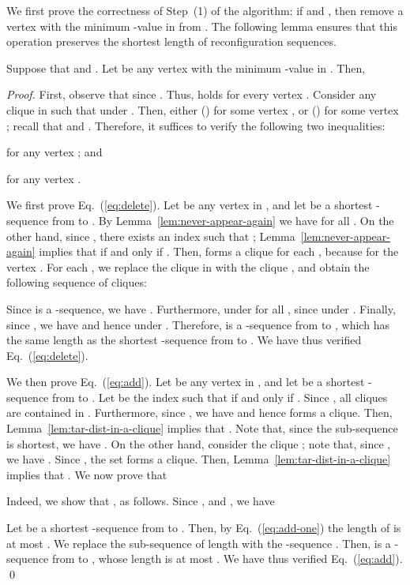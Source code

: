 \documentclass{llncs}
\newcounter{one}
\newcommand{\one}{{\rm \roman{one}}}
\newcounter{two}
\newcommand{\two}{{\rm \roman{two}}}
\begin{document}
	We first prove the correctness of Step~(1) of the algorithm:
if  and , then remove a vertex  with the minimum -value in  from .
The following lemma ensures that this operation preserves the shortest length of reconfiguration sequences.
	\begin{lemma} \label{lem:greedily-removing-a-shortest-interval}
	Suppose that  and .
	Let  be any vertex with the minimum -value in .
	Then, 
	
	\end{lemma}
	\begin{proof}
	First, observe that  since .
	Thus,  holds for every vertex .
	Consider any clique  in  such that  under .
	Then, either (\one)  for some vertex , or (\two)  for some vertex ;
recall that  and . 
	Therefore, it suffices to verify the following two inequalities:
	
for any vertex ; and 
	
for any vertex .
\medskip

	We first prove Eq.~(\ref{eq:delete}). 
	Let  be any vertex in , and let  be a shortest -sequence from  to  .
	By Lemma~\ref{lem:never-appear-again} we have  for all .
	On the other hand, since , there exists an index  such that ;
Lemma~\ref{lem:never-appear-again} implies that  if and only if .
	Then,  forms a clique for each , because  for the vertex .
	For each , we replace the clique  in  with the clique , and obtain the following sequence  of cliques:
	
	Since  is a -sequence, we have .
	Furthermore,  under  for all , since  under .
	Finally, since , we have  and hence  under .
	Therefore,  is a -sequence from  to  , which has the same length  as the shortest -sequence  from  to  .
	We have thus verified Eq.~(\ref{eq:delete}). 
\medskip  

 	We then prove Eq.~(\ref{eq:add}). 
	Let  be any vertex in , and let  be a shortest -sequence from  to  .
	Let  be the index such that  if and only if .
	Since , all cliques  are contained in . 
	Furthermore, since , we have  and hence   forms a clique.
	Then, Lemma~\ref{lem:tar-dist-in-a-clique} implies that .
	Note that, since the sub-sequence  is shortest, we have .
	On the other hand, consider the clique ;
note that, since , we have . 
	Since , the set  forms a clique.
	Then, Lemma~\ref{lem:tar-dist-in-a-clique} implies that .
	We now prove that 
	
	Indeed, we show that , as follows.
	Since ,  and , we have 
	
	Let  be a shortest -sequence from  to .
	Then, by Eq.~(\ref{eq:add-one}) the length of  is at most .
	We replace the sub-sequence  of length  with the -sequence .
	Then,  is a -sequence from  to , whose length is at most .
	We have thus verified Eq.~(\ref{eq:add}). 
\qed
\end{proof}
\end{document}

